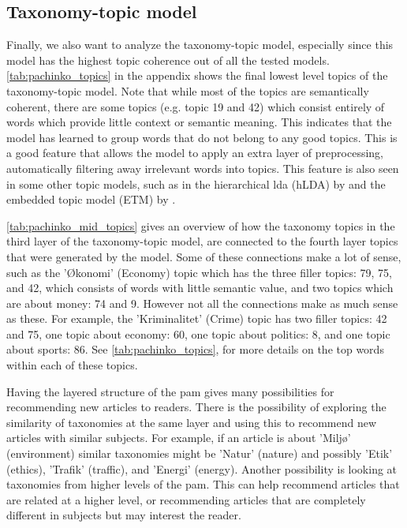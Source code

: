 \subsection{Taxonomy-topic model}\label{sec:taxonomy_analysis}
Finally, we also want to analyze the taxonomy-topic model, especially since this model has the highest topic coherence out of all the tested models.
\autoref{tab:pachinko_topics} in the appendix shows the final lowest level topics of the taxonomy-topic model.
Note that while most of the topics are semantically coherent, there are some topics (e.g. topic 19 and 42) which consist entirely of words which provide little context or semantic meaning.
This indicates that the model has learned to group words that do not belong to any good topics.
This is a good feature that allows the model to apply an extra layer of preprocessing, automatically filtering away irrelevant words into topics.
This feature is also seen in some other topic models, such as in the hierarchical \gls{lda} (hLDA) by \citet{hLDA2004} and the embedded topic model (ETM) by \citet{dieng2020topic}.

\autoref{tab:pachinko_mid_topics} gives an overview of how the taxonomy topics in the third layer of the taxonomy-topic model, are connected to the fourth layer topics that were generated by the model.
Some of these connections make a lot of sense, such as the 'Økonomi' (Economy) topic which has the three filler topics: 79, 75, and 42, which consists of words with little semantic value, and two topics which are about money: 74 and 9.
However not all the connections make as much sense as these. 
For example, the 'Kriminalitet' (Crime) topic has two filler topics: 42 and 75, one topic about economy: 60, one topic about politics: 8, and one topic about sports: 86.
See \autoref{tab:pachinko_topics}, for more details on the top words within each of these topics.

Having the layered structure of the \gls{pam} gives many possibilities for recommending new articles to readers.
There is the possibility of exploring the similarity of taxonomies at the same layer and using this to recommend new articles with similar subjects.
For example, if an article is about 'Miljø' (environment) similar taxonomies might be 'Natur' (nature) and possibly 'Etik' (ethics), 'Trafik' (traffic), and 'Energi' (energy).
Another possibility is looking at taxonomies from higher levels of the \gls{pam}.
This can help recommend articles that are related at a higher level, or recommending articles that are completely different in subjects but may interest the reader.

